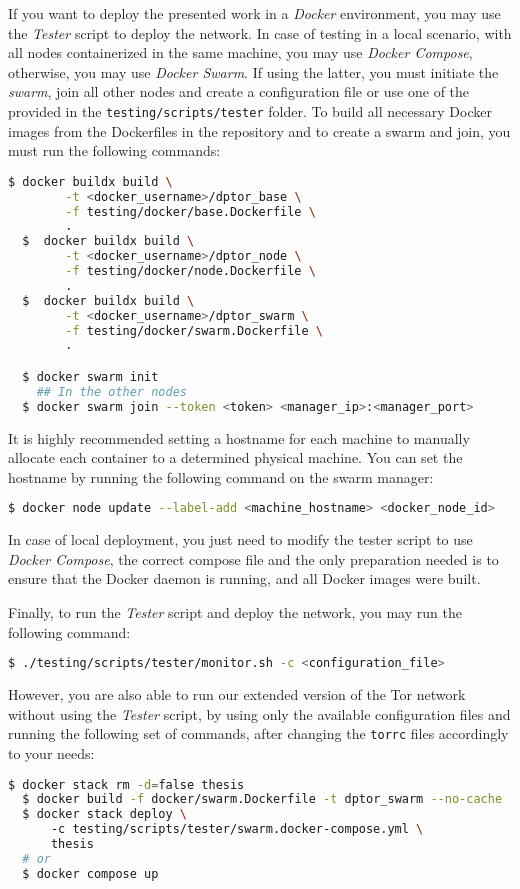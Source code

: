 If you want to deploy the presented work in a \textit{Docker} environment, you may use the \textit{Tester} script to deploy the network. In case of testing in a local scenario, with all nodes containerized in the same machine, you may use \textit{Docker Compose}, otherwise, you may use \textit{Docker Swarm}. If using the latter, you must initiate the \textit{swarm}, join all other nodes and create a configuration file or use one of the provided in the \texttt{testing/scripts/tester} folder. 
To build all necessary Docker images from the Dockerfiles in the repository and to create a swarm and join, you must run the following commands:
\begin{lstlisting}[language=bash]
  $ docker buildx build \
        -t <docker_username>/dptor_base \
        -f testing/docker/base.Dockerfile \
        .
  $  docker buildx build \
        -t <docker_username>/dptor_node \
        -f testing/docker/node.Dockerfile \
        .
  $  docker buildx build \
        -t <docker_username>/dptor_swarm \
        -f testing/docker/swarm.Dockerfile \
        .

  $ docker swarm init 
    ## In the other nodes
  $ docker swarm join --token <token> <manager_ip>:<manager_port>  
\end{lstlisting}

It is highly recommended setting a hostname for each machine to manually allocate each container to a determined physical machine. You can set the hostname by running the following command on the swarm manager:  
\begin{lstlisting}[language=bash]
  $ docker node update --label-add <machine_hostname> <docker_node_id>
\end{lstlisting}

In case of local deployment, you just need to modify the tester script to use \textit{Docker Compose}, the correct compose file and the only preparation needed is to ensure that the Docker daemon is running, and all Docker images were built.

Finally, to run the \textit{Tester} script and deploy the network, you may run the following command:
\begin{lstlisting}[language=bash]
  $ ./testing/scripts/tester/monitor.sh -c <configuration_file>
\end{lstlisting}

However, you are also able to run our extended version of the Tor network without using the \textit{Tester} script, by using only the available configuration files and running the following set of commands, after changing the \texttt{torrc} files accordingly to your needs:  
\begin{lstlisting}[language=bash]
  $ docker stack rm -d=false thesis
  $ docker build -f docker/swarm.Dockerfile -t dptor_swarm --no-cache . 
  $ docker stack deploy \ 
      -c testing/scripts/tester/swarm.docker-compose.yml \
      thesis
  # or 
  $ docker compose up 
\end{lstlisting}

